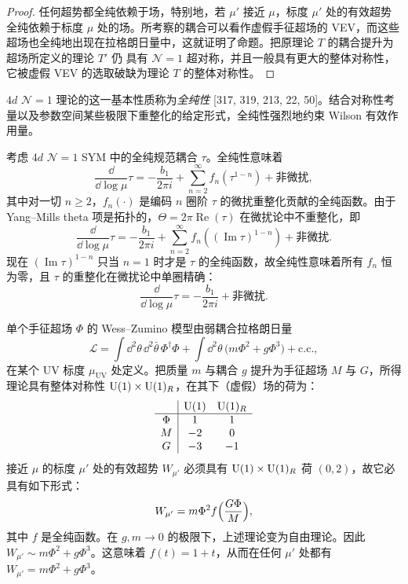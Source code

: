 \begin{proof}
任何超势都全纯依赖于场，特别地，若 $\mu'$ 接近 $\mu$，标度 $\mu'$ 处的有效超势全纯依赖于标度 $\mu$ 处的场。所考察的耦合可以看作虚假手征超场的 VEV，而这些超场也全纯地出现在拉格朗日量中，这就证明了命题。把原理论 $T$ 的耦合提升为超场所定义的理论 $T'$ 仍
具有 $\mathcal{N}=1$ 超对称，并且一般具有更大的整体对称性，它被虚假 VEV 的选取破缺为理论 $T$ 的整体对称性。
\end{proof}

$4d$ $\mathcal{N}=1$ 理论的这一基本性质称为\emph{全纯性} [317, 319, 213, 22, 50]。结合对称性考量以及参数空间某些极限下重整化的给定形式，全纯性强烈地约束 Wilson 有效作用量。

\begin{example}[17.43]
考虑 $4d$ $\mathcal{N}=1$ SYM 中的全纯规范耦合 $\tau$。全纯性意味着
\[
\frac{\dd}{\dd\log\mu}\tau=-\frac{b_1}{2\pi i}+\sum_{n=2}^{\infty}f_n(\tau^{1-n})+\text{非微扰},
\]
其中对一切 $n\ge2$，$f_n(\cdot)$ 是编码 $n$ 圈阶 $\tau$ 的微扰重整化贡献的全纯函数。由于 Yang--Mills theta 项是拓扑的，$\Theta=2\pi\operatorname{Re}(\tau)$ 在微扰论中不重整化，即
\[
\frac{\dd}{\dd\log\mu}\tau=-\frac{b_1}{2\pi i}+\sum_{n=2}^{\infty}f_n((\operatorname{Im}\tau)^{1-n})+\text{非微扰}.
\]
现在 $(\operatorname{Im}\tau)^{1-n}$ 只当 $n=1$ 时才是 $\tau$ 的全纯函数，故全纯性意味着所有 $f_n$ 恒为零，且 $\tau$ 的重整化在微扰论中单圈精确：
\[
\frac{\dd}{\dd\log\mu}\tau=-\frac{b_1}{2\pi i}+\text{非微扰}.
\]
\end{example}

\begin{example}[17.44]
单个手征超场 $\Phi$ 的 Wess--Zumino 模型由弱耦合拉格朗日量
\[
\mathcal{L}=\int\dd^2\theta\,\dd^2\bar\theta\,\Phi^\dagger\Phi+\int\dd^2\theta\,\bigl(m\Phi^2+g\Phi^3\bigr)+\text{c.c.},
\]
在某个 UV 标度 $\mu_{\mathrm{UV}}$ 处定义。把质量 $m$ 与耦合 $g$ 提升为手征超场 $M$ 与 $G$，所得理论具有整体对称性 $\operatorname{U}(1)\times\operatorname{U}(1)_R$，在其下（虚假）场的荷为：
\[
\begin{array}{c|cc}
 & \operatorname{U}(1) & \operatorname{U}(1)_R\\ \hline
\Phi & 1 & 1\\
M & -2 & 0\\
G & -3 & -1
\end{array}
\]
接近 $\mu$ 的标度 $\mu'$ 处的有效超势 $W_{\mu'}$ 必须具有 $\operatorname{U}(1)\times\operatorname{U}(1)_R$ 荷 $(0,2)$，故它必具有如下形式：
\[
W_{\mu'}=m\Phi^2f\Bigl(\frac{G\Phi}{M}\Bigr),
\]
其中 $f$ 是全纯函数。在 $g,m\to0$ 的极限下，上述理论变为自由理论。因此 $W_{\mu'}\sim m\Phi^2+g\Phi^3$。这意味着 $f(t)=1+t$，从而在任何 $\mu'$ 处都有 $W_{\mu'}=m\Phi^2+g\Phi^3$。
\end{example}


